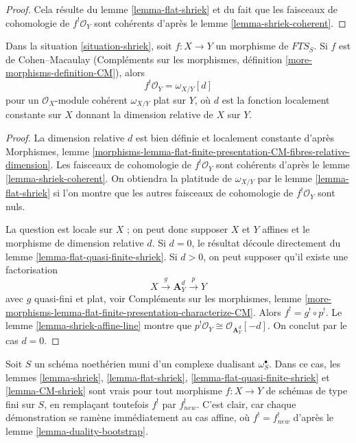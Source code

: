 \begin{proof}
Cela résulte du lemme \ref{lemma-flat-shriek} et du fait que les faisceaux de cohomologie de $f^!\mathcal{O}_Y$ sont cohérents d'après le lemme \ref{lemma-shriek-coherent}.
\end{proof}

\begin{lemma}
\label{lemma-CM-shriek}
Dans la situation \ref{situation-shriek}, soit $f : X \to Y$ un morphisme de $\textit{FTS}_S$. Si $f$ est de Cohen–Macaulay (Compléments sur les morphismes, définition \ref{more-morphisms-definition-CM}), alors
$$
f^!\mathcal{O}_Y = \omega_{X/Y}[d]
$$
pour un $\mathcal{O}_X$-module cohérent $\omega_{X/Y}$ plat sur $Y$, où $d$ est la fonction localement constante sur $X$ donnant la dimension relative de $X$ sur $Y$.
\end{lemma}

\begin{proof}
La dimension relative $d$ est bien définie et localement constante d'après Morphismes, lemme \ref{morphisms-lemma-flat-finite-presentation-CM-fibres-relative-dimension}. Les faisceaux de cohomologie de $f^!\mathcal{O}_Y$ sont cohérents d'après le lemme \ref{lemma-shriek-coherent}. On obtiendra la platitude de $\omega_{X/Y}$ par le lemme \ref{lemma-flat-shriek} si l'on montre que les autres faisceaux de cohomologie de $f^!\mathcal{O}_Y$ sont nuls.

\medskip\noindent
La question est locale sur $X$ ; on peut donc supposer $X$ et $Y$ affines et le morphisme de dimension relative $d$. Si $d = 0$, le résultat découle directement du lemme \ref{lemma-flat-quasi-finite-shriek}. Si $d > 0$, on peut supposer qu'il existe une factorisation
$$
X \xrightarrow{g} \mathbf{A}^d_Y \xrightarrow{p} Y
$$
avec $g$ quasi-fini et plat, voir Compléments sur les morphismes, lemme \ref{more-morphisms-lemma-flat-finite-presentation-characterize-CM}. Alors $f^! = g^! \circ p^!$. Le lemme \ref{lemma-shriek-affine-line} montre que $p^!\mathcal{O}_Y \cong \mathcal{O}_{\mathbf{A}^d_Y}[-d]$. On conclut par le cas $d = 0$.
\end{proof}

\begin{remark}
\label{remark-the-same-is-true}
Soit $S$ un schéma noethérien muni d'un complexe dualisant $\omega_S^\bullet$. Dans ce cas, les lemmes \ref{lemma-shriek}, \ref{lemma-flat-shriek}, \ref{lemma-flat-quasi-finite-shriek} et \ref{lemma-CM-shriek} sont vrais pour tout morphisme $f : X \to Y$ de schémas de type fini sur $S$, en remplaçant toutefois $f^!$ par $f_{new}^!$. C'est clair, car chaque démonstration se ramène immédiatement au cas affine, où $f^! = f_{new}^!$ d'après le lemme \ref{lemma-duality-bootstrap}.
\end{remark}




